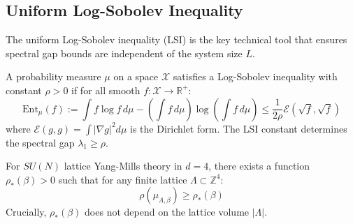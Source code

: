 
\subsection{Uniform Log-Sobolev Inequality}
\label{subsec:uniform_lsi}

The uniform Log-Sobolev inequality (LSI) is the key technical tool that ensures spectral gap bounds are independent of the system size $L$.

\begin{definition}
A probability measure $\mu$ on a space $\mathcal{X}$ satisfies a Log-Sobolev inequality with constant $\rho > 0$ if for all smooth $f: \mathcal{X} \to \mathbb{R}^+$:
\begin{equation}
\mathrm{Ent}_\mu(f) := \int f \log f \, d\mu - \left(\int f \, d\mu\right) \log\left(\int f \, d\mu\right) \leq \frac{1}{2\rho} \mathcal{E}(\sqrt{f}, \sqrt{f})
\end{equation}
where $\mathcal{E}(g, g) = \int |\nabla g|^2 d\mu$ is the Dirichlet form. The LSI constant determines the spectral gap $\lambda_1 \ge \rho$.
\end{definition}

\begin{theorem}
\label{thm:uniform_lsi_main}
For $SU(N)$ lattice Yang-Mills theory in $d=4$, there exists a function $\rho_*(\beta) > 0$ such that for any finite lattice $\Lambda \subset \mathbb{Z}^4$:
\begin{equation}
\rho(\mu_{\Lambda, \beta}) \ge \rho_*(\beta)
\end{equation}
Crucially, $\rho_*(\beta)$ does not depend on the lattice volume $|\Lambda|$.
\end{theorem}

